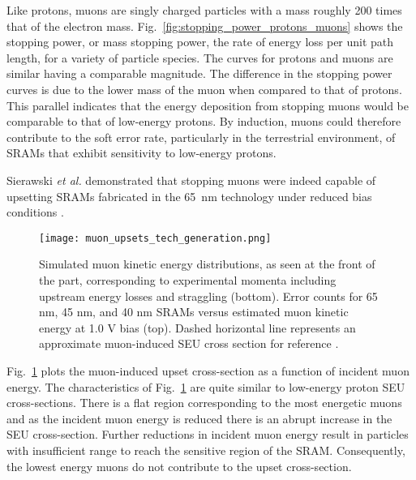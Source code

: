 Like protons, muons are singly charged particles with a mass roughly 200 times that of the electron mass.
Fig.~\ref{fig:stopping_power_protons_muons} shows the stopping power, or mass stopping power, the rate of energy loss per unit path length, for a variety of particle species.
The curves for protons and muons are similar having a comparable magnitude.
The difference in the stopping power curves is due to the lower mass of the muon when compared to that of protons.
This parallel indicates that the energy deposition from stopping muons would be comparable to that of low-energy protons.
By induction, muons could therefore contribute to the soft error rate, particularly in the terrestrial environment, of SRAMs that exhibit sensitivity to low-energy protons.

Sierawski \emph{et al.} demonstrated that stopping muons were indeed capable of upsetting SRAMs fabricated in the 65~nm technology under reduced bias conditions \cite{Sierawski:2010cj}.
\begin{figure}[htbp]
    \begin{center}
        \texttt{[image: muon\_upsets\_tech\_generation.png]}
    \end{center}
    \caption[Simulated muon kinetic energy distributions, as seen at the front of the part, corresponding to experimental momenta including upstream energy losses and straggling (bottom). Error counts for 65 nm, 45 nm, and 40 nm SRAMs versus estimated muon kinetic energy at 1.0 V bias (top). Dashed horizontal line represents an approximate muon-induced SEU cross section for reference.]{Simulated muon kinetic energy distributions, as seen at the front of the part, corresponding to experimental momenta including upstream energy losses and straggling (bottom). Error counts for 65 nm, 45 nm, and 40 nm SRAMs versus estimated muon kinetic energy at 1.0 V bias (top). Dashed horizontal line represents an approximate muon-induced SEU cross section for reference \cite{Sierawski:2010cj}.}
    \label{fig:muon_upsets_energy_dep}
\end{figure}
Fig.~\ref{fig:muon_upsets_energy_dep} plots the muon-induced upset cross-section as a function of incident muon energy.
The characteristics of Fig.~\ref{fig:muon_upsets_energy_dep} are quite similar to low-energy proton SEU cross-sections.
There is a flat region corresponding to the most energetic muons and as the incident muon energy is reduced there is an abrupt increase in the SEU cross-section.
Further reductions in incident muon energy result in particles with insufficient range to reach the sensitive region of the SRAM.
Consequently, the lowest energy muons do not contribute to the upset cross-section.


